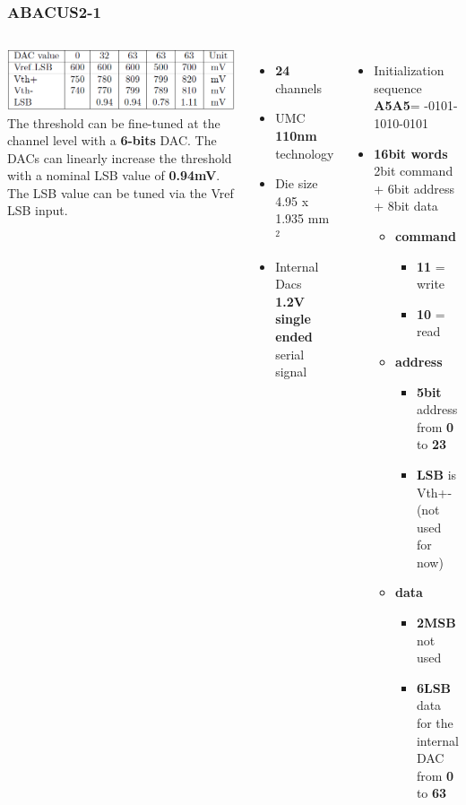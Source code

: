 \documentclass[aspectratio=169]{beamer}
\begin{document}
	\begin{frame}
	\frametitle{ABACUS2-1}
		\begin{columns}
			\begin{center}
				\includegraphics[width=0.8 \textwidth]{IMG/TableLSB.PNG}
				\newline
				The threshold can be fine-tuned at the channel level with a \textbf{6-bits} DAC. The DACs can linearly increase the threshold with a nominal LSB value of \textbf{0.94mV}. The LSB value can be tuned via the Vref LSB input.
			\end{center}
			\begin{itemize}
				\item \textbf{24} channels
				\item UMC \textbf{110nm} technology
				\item Die size 4.95 x 1.935 mm$^2$
				\item Internal Dacs \textbf{1.2V single ended} serial signal
			\end{itemize}
			\begin{itemize}
				\item Initialization sequence \textbf{A5A5}= 
				-0101-1010-0101
				\item \textbf{16bit words} 2bit command + 6bit address + 8bit data
				\begin{itemize}
					\item \textbf{command}
					\begin{itemize}
						\item \textbf{11} = write
						\item \textbf{10} = read
					\end{itemize}
					\item \textbf{address}
					\begin{itemize}
						\item \textbf{5bit} address from \textbf{0} to \textbf{23}
						\item \textbf{LSB} is Vth+- (not used for now)
					\end{itemize}
					\item \textbf{data}
					\begin{itemize}
						\item \textbf{2MSB} not used
						\item \textbf{6LSB} data for the internal DAC \newline from \textbf{0} to \textbf{63}
					\end{itemize}
				\end{itemize} 
			\end{itemize}
		\end{columns}
	\end{frame}
\end{document}
